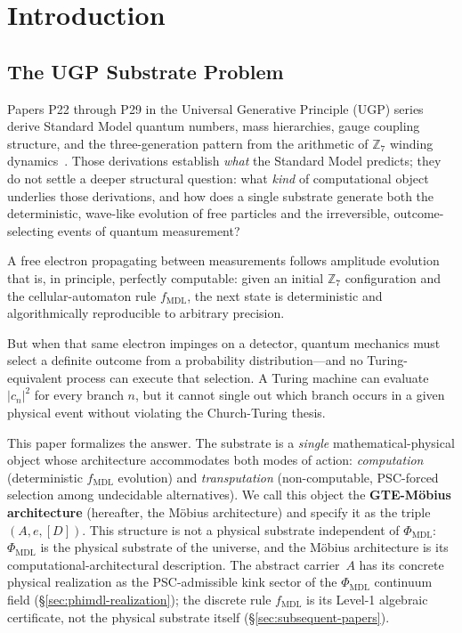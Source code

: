 \documentclass[12pt,letterpaper]{article}
\newcommand{\fmdl}{f_{\mathrm{MDL}}}
\newcommand{\Zseven}{\mathbb{Z}_7}
\newcommand{\Dclass}{[D]}
\begin{document}
\tableofcontents
\newpage

\section{Introduction}
\label{sec:intro}

\subsection{The UGP Substrate Problem}
\label{sec:substrate-problem}

Papers P22 through P29 in the Universal Generative Principle (UGP) series derive
Standard Model quantum numbers, mass hierarchies, gauge coupling structure, and the
three-generation pattern from the arithmetic of $\Zseven$ winding
dynamics~\cite{SpivackCompUniversality}.  Those derivations establish \emph{what} the Standard Model
predicts; they do not settle a deeper structural question: what \emph{kind} of
computational object underlies those derivations, and how does a single substrate
generate both the deterministic, wave-like evolution of free particles and the
irreversible, outcome-selecting events of quantum measurement?

A free electron propagating between measurements follows amplitude evolution that is,
in principle, perfectly computable: given an initial $\Zseven$ configuration and the
cellular-automaton rule $\fmdl$, the next state is deterministic and
algorithmically reproducible to arbitrary precision.

But when that same electron impinges on a detector, quantum mechanics must select a
definite outcome from a probability distribution---and no Turing-equivalent process
can execute that selection.  A Turing machine can evaluate $|c_n|^2$ for every branch
$n$, but it cannot single out which branch occurs in a given physical event without
violating the Church-Turing thesis.

This paper formalizes the answer.  The substrate is a \emph{single}
mathematical-physical object whose architecture accommodates both modes of action:
\emph{computation} (deterministic $\fmdl$ evolution) and \emph{transputation}
(non-computable, PSC-forced selection among undecidable alternatives).  We call this
object the \textbf{GTE-M\"{o}bius architecture} (hereafter, the M\"{o}bius architecture)
and specify it as the triple $(A, e, \Dclass)$.
This structure is not a physical substrate independent of $\Phi_{\mathrm{MDL}}$:
$\Phi_{\mathrm{MDL}}$ is the physical substrate of the universe, and the M\"{o}bius
architecture is its computational-architectural description.
The abstract carrier~$A$ has its concrete physical realization as the
PSC-admissible kink sector of the $\Phi_{\mathrm{MDL}}$ continuum field
(\S\ref{sec:phimdl-realization}); the discrete rule $\fmdl$ is its Level-1
algebraic certificate, not the physical substrate itself
(\S\ref{sec:subsequent-papers}).
\end{document}
